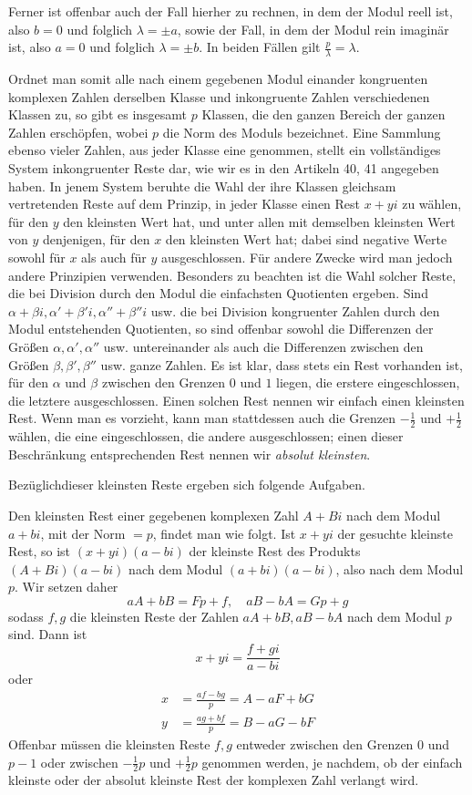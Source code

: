 Ferner ist offenbar auch der Fall hierher zu rechnen, in dem der Modul reell ist, also $b=0$ und folglich $\lambda=\pm a$, sowie der Fall, in dem der Modul rein imaginär ist, also $a=0$ und folglich $\lambda=\pm b$. In beiden Fällen gilt $\frac p\lambda=\lambda$.

%
Ordnet man somit alle nach einem gegebenen Modul einander kongruenten komplexen Zahlen derselben Klasse und inkongruente Zahlen verschiedenen Klassen zu, so gibt es insgesamt $p$ Klassen, die den ganzen Bereich der ganzen Zahlen erschöpfen, wobei $p$ die Norm des Moduls bezeichnet. Eine Sammlung ebenso vieler Zahlen, aus jeder Klasse eine genommen, stellt ein vollständiges System inkongruenter Reste dar, wie wir es in den Artikeln 40, 41 angegeben haben. In jenem System beruhte die Wahl der ihre Klassen gleichsam vertretenden Reste auf dem Prinzip, in jeder Klasse einen Rest $x+yi$ zu wählen, für den $y$ den kleinsten Wert hat, und unter allen mit demselben kleinsten Wert von $y$ denjenigen, für den $x$ den kleinsten Wert hat; dabei sind negative Werte sowohl für $x$ als auch für $y$ ausgeschlossen. Für andere Zwecke wird man jedoch andere Prinzipien verwenden. Besonders zu beachten ist die Wahl solcher Reste, die bei Division durch den Modul die einfachsten Quotienten ergeben. Sind $\alpha+\beta i,\alpha'+\beta'i,\alpha''+\beta''i$ usw. die bei Division kongruenter Zahlen durch den Modul entstehenden Quotienten, so sind offenbar sowohl die Differenzen der Größen $\alpha,\alpha',\alpha''$ usw. untereinander als auch die Differenzen zwischen den Größen $\beta,\beta',\beta''$ usw. ganze Zahlen. Es ist klar, dass stets ein Rest vorhanden ist, für den $\alpha$ und $\beta$ zwischen den Grenzen $0$ und $1$ liegen, die erstere eingeschlossen, die letztere ausgeschlossen. Einen solchen Rest nennen wir einfach einen kleinsten Rest. Wenn man es vorzieht, kann man stattdessen auch die Grenzen $-\frac12$ und $+\frac12$ wählen, die eine eingeschlossen, die andere ausgeschlossen; einen dieser Beschränkung entsprechenden Rest nennen wir \emph{absolut kleinsten}.

Bezüglich\textperiodcentered dieser kleinsten Reste ergeben sich folgende Aufgaben.

Den kleinsten Rest einer gegebenen komplexen Zahl $A+Bi$ nach dem Modul $a+bi$, mit der Norm $=p$, findet man wie folgt. Ist $x+yi$ der gesuchte kleinste Rest, so ist $(x+yi)(a-bi)$ der kleinste Rest des Produkts $(A+Bi)(a-bi)$ nach dem Modul $(a+bi)(a-bi)$, also nach dem Modul $p$. Wir setzen daher
\[
aA+bB=Fp+f,\quad aB-bA=Gp+g
\]
sodass $f,g$ die kleinsten Reste der Zahlen $aA+bB,aB-bA$ nach dem Modul $p$ sind. Dann ist
%
\[
x+yi=\frac{f+gi}{a-bi}
\]
oder
\begingroup{}\relax
\[
\begin{aligned}
x&=\frac{af-bg}{p}=A-aF+bG\\
y&=\frac{ag+bf}{p}=B-aG-bF
\end{aligned}
\]
Offenbar müssen die kleinsten Reste $f,g$ entweder zwischen den Grenzen $0$ und $p-1$ oder zwischen $-\frac12p$ und $+\frac12p$ genommen werden, je nachdem, ob der einfach kleinste oder der absolut kleinste Rest der komplexen Zahl verlangt wird.\endgroup

